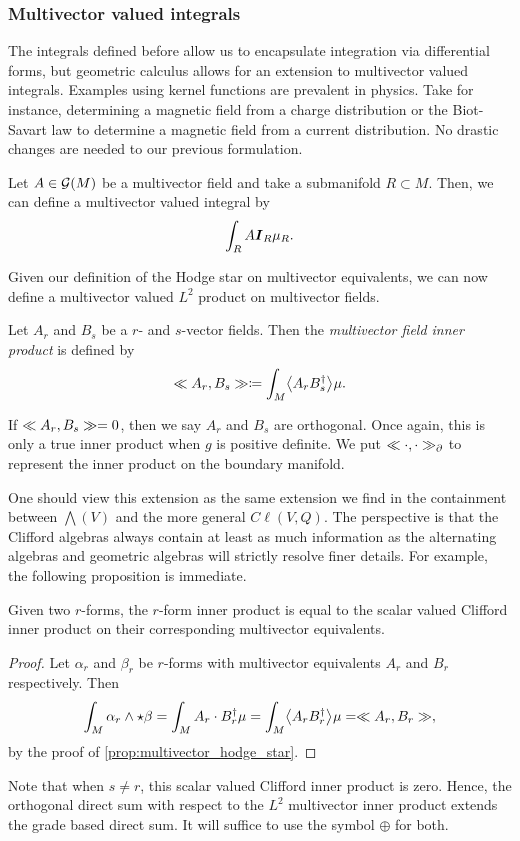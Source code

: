 \subsubsection{Multivector valued integrals}

The integrals defined before allow us to encapsulate integration via differential forms, but geometric calculus allows for an extension to multivector valued integrals. Examples using kernel functions are prevalent in physics. Take for instance, determining a magnetic field from a charge distribution or the Biot-Savart law to determine a magnetic field from a current distribution. No drastic changes are needed to our previous formulation. 

Let $A\in \mathcal{G}(M)$ be a multivector field and take a submanifold $R\subset M$. Then, we can define a multivector valued integral by
\begin{equation}
\int_R A \boldsymbol{I}_R \mu_R.
\end{equation}


Given our definition of the Hodge star on multivector equivalents, we can now define a multivector valued $L^2$ product on multivector fields.
\begin{definition}
Let $A_r$ and $B_s$ be a $r$- and $s$-vector fields. Then the \emph{multivector field inner product} is defined by
\begin{equation}
\multivecinnerproduct{A_r}{B_s} \coloneqq \int_M \proj{}{A_r B_s^\dagger} \mu.
\end{equation}
\end{definition}
If $\ll A_r, B_s\gg = 0$, then we say $A_r$ and $B_s$ are orthogonal. Once again, this is only a true inner product when $g$ is positive definite.  We put $\ll \cdot, \cdot\gg_\partial$ to represent the inner product on the boundary manifold. 

One should view this extension as the same extension we find in the containment between $\bigwedge(V)$ and the more general $C\ell(V,Q)$. The perspective is that the Clifford algebras always contain at least as much information as the alternating algebras and geometric algebras will strictly resolve finer details. For example, the following proposition is immediate.
\begin{proposition}
Given two $r$-forms, the $r$-form inner product is equal to the scalar valued Clifford inner product on their corresponding multivector equivalents.
\end{proposition}
\begin{proof}
Let $\alpha_r$ and $\beta_r$ be $r$-forms with multivector equivalents $A_r$ and $B_r$ respectively. Then
\begin{align*}
    \int_M \alpha_r \wedge \star \beta = \int_M A_r \cdot B_r^\dagger \mu = \int_M \proj{}{A_rB_r^\dagger} \mu = \multivecinnerproduct{A_r}{B_r},
\end{align*}
by the proof of \cref{prop:multivector_hodge_star}. 
\end{proof}
Note that when $s\neq r$, this scalar valued Clifford inner product is zero. Hence, the orthogonal direct sum with respect to the $L^2$ multivector inner product extends the grade based direct sum. It will suffice to use the symbol $\oplus$ for both. 

